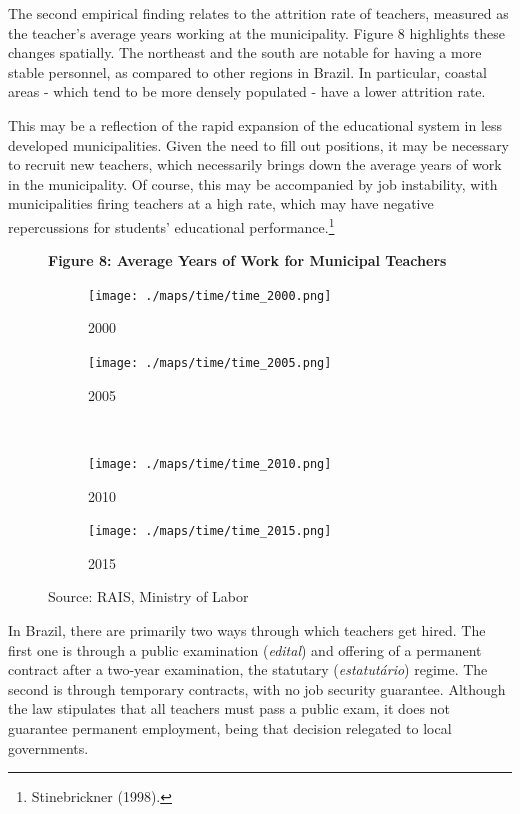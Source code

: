 \documentclass[12pt,]{article}
\let\rmarkdownfootnote\footnote%
\def\footnote{\protect\rmarkdownfootnote}
\begin{document}
The second empirical finding relates to the attrition rate of teachers,
measured as the teacher's average years working at the municipality.
Figure 8 highlights these changes spatially. The northeast and the south
are notable for having a more stable personnel, as compared to other
regions in Brazil. In particular, coastal areas - which tend to be more
densely populated - have a lower attrition rate.

This may be a reflection of the rapid expansion of the educational
system in less developed municipalities. Given the need to fill out
positions, it may be necessary to recruit new teachers, which
necessarily brings down the average years of work in the municipality.
Of course, this may be accompanied by job instability, with
municipalities firing teachers at a high rate, which may have negative
repercussions for students' educational performance.\footnote{Stinebrickner
  (1998).}

\begin{figure}
    \centering
    \textbf{Figure 8: Average Years of Work for Municipal Teachers}
    \begin{subfigure}{0.4\textwidth}
        \centering 
        \texttt{[image: ./maps/time/time\_2000.png]}
        \caption{2000}
    \end{subfigure} %
    \begin{subfigure}{0.4\textwidth}
        \centering
        \texttt{[image: ./maps/time/time\_2005.png]}
        \caption{2005}
    \end{subfigure} \\
    \begin{subfigure}{0.4\textwidth}
        \centering
        \texttt{[image: ./maps/time/time\_2010.png]}
        \caption{2010}
    \end{subfigure} %
    \begin{subfigure}{0.4\textwidth}
        \centering
        \texttt{[image: ./maps/time/time\_2015.png]}
        \caption{2015}
    \end{subfigure}
    \caption*{\footnotesize \hfill Source: RAIS, Ministry of Labor}
\end{figure}

In Brazil, there are primarily two ways through which teachers get
hired. The first one is through a public examination (\emph{edital}) and
offering of a permanent contract after a two-year examination, the
statutary (\emph{estatutário}) regime. The second is through temporary
contracts, with no job security guarantee. Although the law stipulates
that all teachers must pass a public exam, it does not guarantee
permanent employment, being that decision relegated to local
governments.
\end{document}
